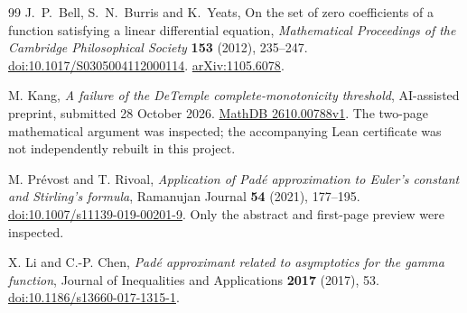 \documentclass[11pt,a4paper]{article}
\theoremstyle{definition}
\theoremstyle{remark}
\numberwithin{equation}{section}
\begin{document}
\begin{thebibliography}{99}
J.~P.~Bell, S.~N.~Burris and K.~Yeats,
On the set of zero coefficients of a function satisfying a linear
differential equation,
\emph{Mathematical Proceedings of the Cambridge Philosophical Society}
\textbf{153} (2012), 235--247.
\href{https://doi.org/10.1017/S0305004112000114}{doi:10.1017/S0305004112000114}.
\href{https://arxiv.org/abs/1105.6078}{arXiv:1105.6078}.

M. Kang,
\emph{A failure of the DeTemple complete-monotonicity threshold},
AI-assisted preprint, submitted 28 October 2026.
\href{https://mathdb.com/abs/2610.00788v1}{MathDB 2610.00788v1}.
The two-page mathematical argument was inspected; the accompanying
Lean certificate was not independently rebuilt in this project.


M. Pr\'evost and T. Rivoal,
\emph{Application of Pad\'e approximation to Euler's constant and
Stirling's formula}, Ramanujan Journal \textbf{54} (2021), 177--195.
\href{https://doi.org/10.1007/s11139-019-00201-9}{doi:10.1007/s11139-019-00201-9}.
Only the abstract and first-page preview were inspected.

X. Li and C.-P. Chen,
\emph{Pad\'e approximant related to asymptotics for the gamma function},
Journal of Inequalities and Applications \textbf{2017} (2017), 53.
\href{https://doi.org/10.1186/s13660-017-1315-1}{doi:10.1186/s13660-017-1315-1}.

\end{thebibliography}
\end{document}
